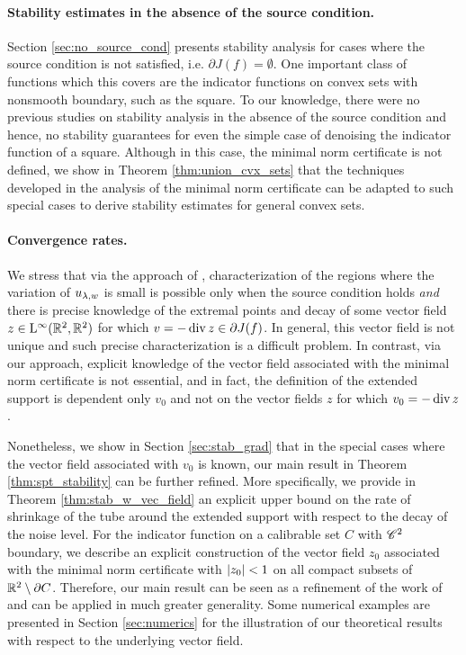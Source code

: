 \paragraph{Stability estimates in the absence of the source condition.}
Section \ref{sec:no_source_cond} presents stability analysis for cases where the source condition is not satisfied, i.e. $\partial J(f) = \emptyset$. One important class of functions which this covers are the indicator functions  on convex sets with nonsmooth boundary, such as the  square. To our knowledge, there were no previous studies on stability analysis in the absence of the source condition and hence, no stability guarantees for even the simple case of denoising the indicator function of a square. Although  in this case, the minimal norm certificate  is not defined, we show in Theorem \ref{thm:union_cvx_sets} that the techniques developed in the analysis of the minimal norm certificate can be adapted to such special cases to derive stability estimates for general convex sets.



\paragraph{Convergence rates.}

We stress that  via the approach of \cite{burger2004convergence}, characterization of the regions where the variation of $u_{\lambda,w}$ is small is possible only when the source condition holds \emph{and} there is precise knowledge of the extremal points and decay of some vector field $z\in \mathrm{L}^\infty(\mathbb{R}^2, \mathbb{R}^2)$ for which $v=-\operatorname{div} z \in \partial J(f)$. In general, this vector field  is not unique and such precise characterization is a difficult problem. 
In contrast, via our approach, explicit knowledge of the vector field associated with the minimal norm certificate is not essential, and in fact, the definition of the extended support is dependent only $v_0$ and not on the vector fields $z$ for which $v_0= -\operatorname{div} z$.  

Nonetheless, we show in Section \ref{sec:stab_grad} that in the special cases where the vector field associated with $v_0$ is known, our main result in Theorem \ref{thm:spt_stability} can be further refined.
More specifically, we provide in Theorem \ref{thm:stab_w_vec_field} an explicit upper bound on the rate of shrinkage of the tube around the extended support with respect to the decay of the noise level. For the indicator function on a calibrable set $C$ with $\mathscr{C}^{2}$ boundary,  we describe an explicit construction of the vector field $z_0$ associated with the minimal norm certificate with $\left| z_0 \right|<1$ on all compact subsets of $\mathbb{R}^2\setminus \partial C$.
Therefore, our main result can be seen as a refinement of the work of \cite{burger2004convergence} and can be applied in much greater generality. Some numerical examples are presented in Section \ref{sec:numerics} for the illustration of our theoretical results with respect to the underlying vector field.



